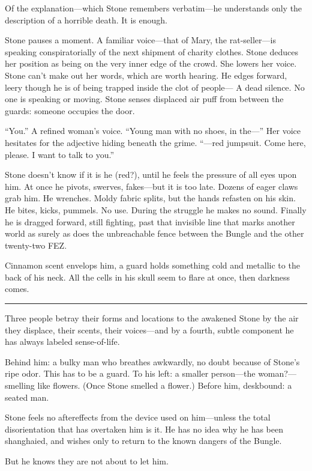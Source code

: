 Of the explanation---which Stone remembers verbatim---he understands only the description of a horrible death. It is enough.

Stone pauses a moment. A familiar voice---that of Mary, the rat-seller---is speaking conspiratorially of the next shipment of charity clothes. Stone deduces her position as being on the very inner edge of the crowd. She lowers her voice. Stone can't make out her words, which are worth hearing. He edges forward, leery though he is of being trapped inside the clot of people--- A dead silence. No one is speaking or moving. Stone senses displaced air puff from between the guards: someone occupies the door.

``You.'' A refined woman's voice. ``Young man with no shoes, in the---'' Her voice hesitates for the adjective hiding beneath the grime. ``---red jumpsuit. Come here, please. I want to talk to you.''

Stone doesn't know if it is he (red?), until he feels the pressure of all eyes upon him. At once he pivots, swerves, fakes---but it is too late. Dozens of eager claws grab him. He wrenches. Moldy fabric splits, but the hands refasten on his skin. He bites, kicks, pummels. No use. During the struggle he makes no sound. Finally he is dragged forward, still fighting, past that invisible line that marks another world as surely as does the unbreachable fence between the Bungle and the other twenty-two FEZ.

Cinnamon scent envelops him, a guard holds something cold and metallic to the back of his neck. All the cells in his skull seem to flare at once, then darkness comes.

\fancybreak{* * *}

Three people betray their forms and locations to the awakened Stone by the air they displace, their scents, their voices---and by a fourth, subtle component he has always labeled sense-of-life.

Behind him: a bulky man who breathes awkwardly, no doubt because of Stone's ripe odor. This has to be a guard. To his left: a smaller person---the woman?---smelling like flowers. (Once Stone smelled a flower.) Before him, deskbound: a seated man.

Stone feels no aftereffects from the device used on him---unless the total disorientation that has overtaken him is it. He has no idea why he has been shanghaied, and wishes only to return to the known dangers of the Bungle.

But he knows they are not about to let him.

